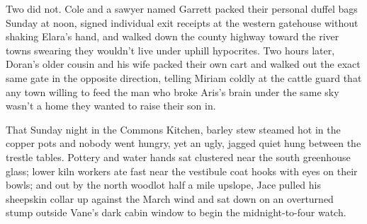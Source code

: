 Two did not. Cole and a sawyer named Garrett packed their personal duffel bags Sunday at noon, signed individual exit receipts at the western gatehouse without shaking Elara's hand, and walked down the county highway toward the river towns swearing they wouldn't live under uphill hypocrites. Two hours later, Doran's older cousin and his wife packed their own cart and walked out the exact same gate in the opposite direction, telling Miriam coldly at the cattle guard that any town willing to feed the man who broke Aris's brain under the same sky wasn't a home they wanted to raise their son in.

That Sunday night in the Commons Kitchen, barley stew steamed hot in the copper pots and nobody went hungry, yet an ugly, jagged quiet hung between the trestle tables. Pottery and water hands sat clustered near the south greenhouse glass; lower kiln workers ate fast near the vestibule coat hooks with eyes on their bowls; and out by the north woodlot half a mile upslope, Jace pulled his sheepskin collar up against the March wind and sat down on an overturned stump outside Vane's dark cabin window to begin the midnight-to-four watch.
